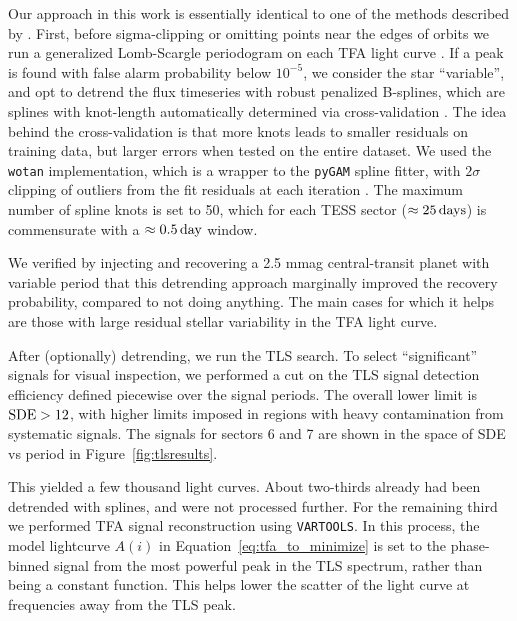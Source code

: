 \documentclass[12pt,twocolumn,tighten]{aastex62}
\begin{document}
Our approach in this work is essentially identical to one of the
methods described by \citet{hippke_wotan_2019}.  First, before
sigma-clipping or omitting points near the edges of orbits we run a
generalized Lomb-Scargle periodogram on each TFA light curve
\citep{lomb_1976,scargle_studies_1982,vanderplas_periodograms_2015}.
If a peak is found with false alarm probability below $10^{-5}$, we
consider the star ``variable'', and opt to detrend the flux timeseries
with robust penalized B-splines, which are splines with knot-length
automatically determined via cross-validation
\citep{eilers_flexible_1996}. The idea behind the cross-validation is
that more knots leads to smaller residuals on training data, but
larger errors when tested on the entire dataset.  We used the
\texttt{wotan} implementation, which is a wrapper to the
\texttt{pyGAM} spline fitter, with $2\sigma$ clipping of outliers from
the fit residuals at each iteration
\citep{serven_pygam_2018_1476122,hippke_wotan_2019}.  The maximum
number of spline knots is set to 50, which for each TESS sector
($\approx 25\,{\rm days}$) is commensurate with a $\approx0.5\,{\rm
day}$ window.

We verified by injecting and recovering a 2.5 mmag central-transit
planet with variable period that this detrending approach marginally
improved the recovery probability, compared to not doing anything.
The main cases for which it helps are those with large residual
stellar variability in the TFA light curve.

After (optionally) detrending, we run the TLS search. To select
``significant'' signals for visual inspection, we performed a cut on
the TLS signal detection efficiency defined piecewise over the signal
periods.  The overall lower limit is ${\rm SDE} > 12$, with higher
limits imposed in regions with heavy contamination from systematic
signals.  The signals for sectors 6 and 7 are shown in the space of
SDE vs period in Figure~\ref{fig:tlsresults}.

This yielded a few thousand light curves.  About two-thirds already
had been detrended with splines, and were not processed further.  For
the remaining third we performed TFA signal reconstruction using
\texttt{VARTOOLS}.  In this process, the model lightcurve $A(i)$ in
Equation~\ref{eq:tfa_to_minimize} is set to the phase-binned signal
from the most powerful peak in the TLS spectrum, rather than being a
constant function.  This helps lower the scatter of the light curve at
frequencies away from the TLS peak.
\end{document}
